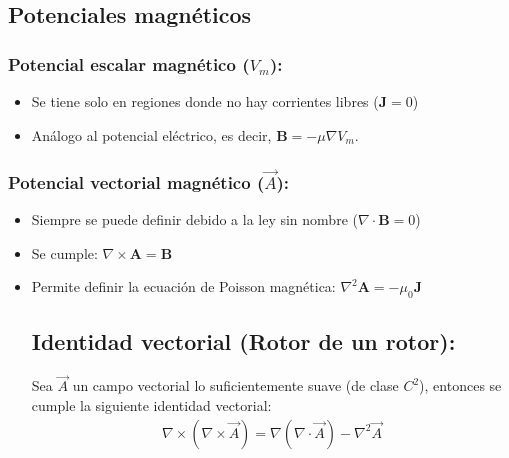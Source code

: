 \documentclass[
  11pt,
  letterpaper,
   answers
  ]{exam}
\begin{document}
\subsection*{Potenciales magnéticos}
\subsubsection*{Potencial escalar magnético ($V_m$):}
\begin{itemize}
    \item Se tiene solo en regiones donde no hay corrientes libres ($\mathbf{J} = 0$)
    \item Análogo al potencial eléctrico, es decir, $\mathbf{B} = -\mu \nabla V_m$.
\end{itemize}
\subsubsection*{Potencial vectorial magnético ($\vec{A}$):}
\begin{itemize}
    \item Siempre se puede definir debido a la ley sin nombre ($\nabla \cdot \mathbf{B} = 0$)
    \item Se cumple: $\nabla \times \mathbf{A}= \mathbf{B}$
    \item Permite definir la ecuación de Poisson magnética: $\nabla^2 \mathbf{A}=-\mu_0 \mathbf{J}$

\subsection*{Identidad vectorial (Rotor de un rotor):} Sea $\vec{A}$ un campo vectorial lo suficientemente suave (de clase $C^2$), entonces se cumple la siguiente identidad vectorial:
\begin{align}
    \nabla \times (\nabla \times \vec{A}) = \nabla (\nabla \cdot \vec{A}) - \nabla^2 \vec{A}
\end{align}
\end{itemize}

\newpage
\end{document}
